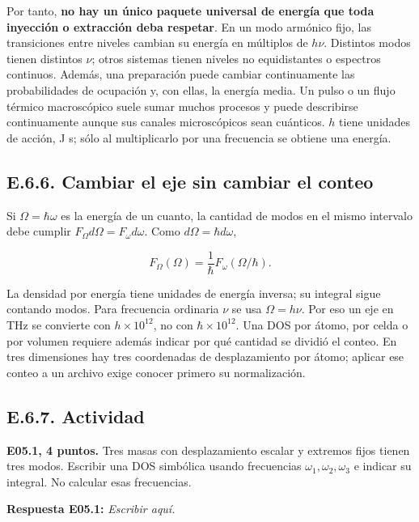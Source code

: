 \documentclass[
  spanish,
  10pt,
  a4paper,
]{article}
\begin{document}
Por tanto, \textbf{no hay un único paquete universal de energía que toda
inyección o extracción deba respetar}. En un modo armónico fijo, las
transiciones entre niveles cambian su energía en múltiplos de \(h\nu\).
Distintos modos tienen distintos \(\nu\); otros sistemas tienen niveles
no equidistantes o espectros continuos. Además, una preparación puede
cambiar continuamente las probabilidades de ocupación y, con ellas, la
energía media. Un pulso o un flujo térmico macroscópico suele sumar
muchos procesos y puede describirse continuamente aunque sus canales
microscópicos sean cuánticos. \(h\) tiene unidades de acción, J s; sólo
al multiplicarlo por una frecuencia se obtiene una energía.

\subsection{E.6.6. Cambiar el eje sin cambiar el
conteo}\label{e.6.6.-cambiar-el-eje-sin-cambiar-el-conteo}

Si \(\Omega=\hbar\omega\) es la energía de un cuanto, la cantidad de
modos en el mismo intervalo debe cumplir
\(F_\Omega d\Omega=F_\omega d\omega\). Como \(d\Omega=\hbar d\omega\),

\[
F_\Omega(\Omega)=\frac1\hbar F_\omega(\Omega/\hbar).
\tag{E.16}
\]

La densidad por energía tiene unidades de energía inversa; su integral
sigue contando modos. Para frecuencia ordinaria \(\nu\) se usa
\(\Omega=h\nu\). Por eso un eje en THz se convierte con
\(h\times10^{12}\), no con \(\hbar\times10^{12}\). Una DOS por átomo,
por celda o por volumen requiere además indicar por qué cantidad se
dividió el conteo. En tres dimensiones hay tres coordenadas de
desplazamiento por átomo; aplicar ese conteo a un archivo exige conocer
primero su normalización.

\subsection{E.6.7. Actividad}\label{e.6.7.-actividad}


\textbf{E05.1, 4 puntos.} Tres masas con desplazamiento escalar y
extremos fijos tienen tres modos. Escribir una DOS simbólica usando
frecuencias \(\omega_1,\omega_2,\omega_3\) e indicar su integral. No
calcular esas frecuencias.

\textbf{Respuesta E05.1:} \emph{Escribir aquí.}

\end{document}

